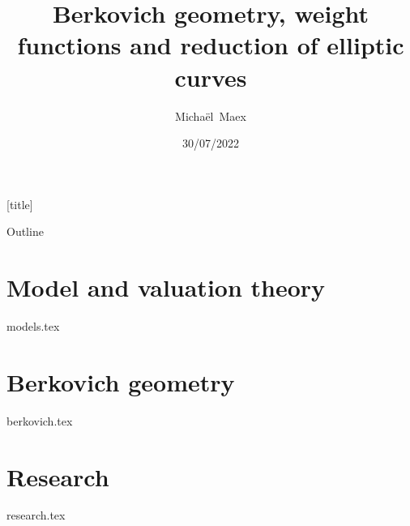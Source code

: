 \documentclass[t,12pt,english,aspectratio=169]{beamer}
\title{Berkovich geometry, weight functions and reduction of elliptic curves}
\author{\mbox{Michaël Maex}}
\date{30/07/2022}
\institute{Supervised by J.\ Nicaise}
\begin{document}
[title]

\begin{frame}
    \titlepage
\end{frame}

\usedefaultcanvas


\emptyfooter
\begin{frame}[noframenumbering]{Outline}
        \tableofcontents
    \end{frame}
\largefooter


\section{Model and valuation theory} \label{sec:model_and_valuation_theory}
{models.tex}

\begin{frame}
	\tableofcontents[ 
currentsection, 
hideothersubsections, 
sectionstyle=show/shaded, 
subsectionstyle=show/shaded, 
]
\end{frame}
\section{Berkovich geometry} \label{sec:berkovich_geometry}
{berkovich.tex}

\section{Research} \label{sec:research}
{research.tex}
\end{document}
